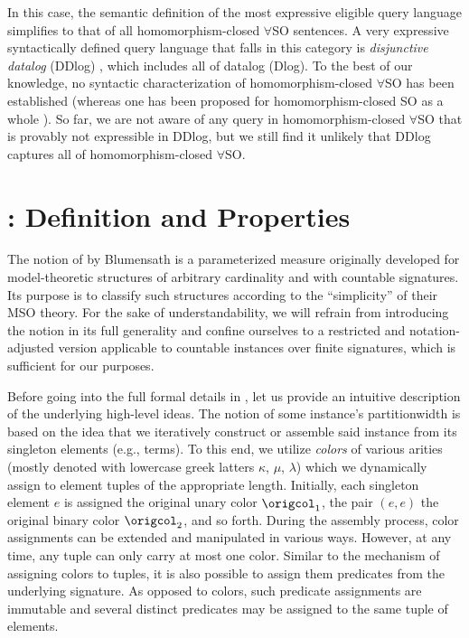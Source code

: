 
\medskip {}
In this case, the semantic definition of the most expressive eligible query language simplifies to that of all homomorphism-closed $\forall$SO sentences. A very expressive syntactically defined query language that falls in this category is \emph{disjunctive datalog} (DDlog) \cite{EiterGM97}, which includes all of datalog (Dlog). 
To the best of our knowledge, no syntactic characterization of homomorphism-closed $\forall$SO has been established (whereas one has been proposed for homomorphism-closed SO as a whole \cite[Cor. 61]{BodirskyFKR21}).
So far, we are not aware of any query in homomorphism-closed $\forall$SO that is provably not expressible in DDlog, but we still find it unlikely that DDlog captures all of homomorphism-closed $\forall$SO.  


\section{\Partitionwidth{}: Definition and Properties}\label{sec:partitionwidth}

The notion of \emph{\partitionwidth{}} by Blumensath \cite{Blumensath03,Blumensath06} is a parameterized measure originally developed for model-theoretic structures of arbitrary cardinality and with countable signatures. Its purpose is to classify such structures according to the ``simplicity'' of their MSO theory. For the sake of understandability, we will refrain from introducing the notion in its full generality and confine ourselves to a restricted and notation-adjusted version applicable to countable instances over finite signatures, which is sufficient for our purposes. 

Before going into the full formal details in , let us provide an intuitive description of the underlying high-level ideas.
%
%
The notion of some instance's partitionwidth is based on the idea that we iteratively construct or assemble said instance 
from its singleton elements (e.g., terms). To this end, we utilize \emph{colors} of various arities (mostly denoted with lowercase greek latters $\kappa$, $\mu$, $\lambda$) which we dynamically assign to element tuples of the appropriate length. Initially, each singleton element $e$ is assigned the original unary color $\origcol_1$, the pair $(e,e)$ the original binary color $\origcol_2$, and so forth. During the assembly process, color assignments can be extended and manipulated in various ways. However, at any time, any tuple can only carry at most one color. Similar to the mechanism of assigning colors to tuples, it is also possible to assign them predicates from the underlying signature. As opposed to colors, such predicate assignments are immutable and several distinct predicates may be assigned to the same tuple of elements.

